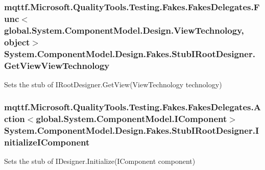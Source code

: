 \hypertarget{class_system_1_1_component_model_1_1_design_1_1_fakes_1_1_stub_i_root_designer_a5acef1b228e6d2b1a75b8c52c7bd778d}{
\subsubsection[{Get\-View\-View\-Technology}]{\setlength{\rightskip}{0pt plus 5cm}mqttf.\-Microsoft.\-Quality\-Tools.\-Testing.\-Fakes.\-Fakes\-Delegates.\-Func$<$global.\-System.\-Component\-Model.\-Design.\-View\-Technology, object$>$ System.\-Component\-Model.\-Design.\-Fakes.\-Stub\-I\-Root\-Designer.\-Get\-View\-View\-Technology}}\label{class_system_1_1_component_model_1_1_design_1_1_fakes_1_1_stub_i_root_designer_a5acef1b228e6d2b1a75b8c52c7bd778d}


Sets the stub of I\-Root\-Designer.\-Get\-View(\-View\-Technology technology)

\hypertarget{class_system_1_1_component_model_1_1_design_1_1_fakes_1_1_stub_i_root_designer_a49ed8935f8f58d52b224edd3f7c7d567}{
\subsubsection[{Initialize\-I\-Component}]{\setlength{\rightskip}{0pt plus 5cm}mqttf.\-Microsoft.\-Quality\-Tools.\-Testing.\-Fakes.\-Fakes\-Delegates.\-Action$<$global.\-System.\-Component\-Model.\-I\-Component$>$ System.\-Component\-Model.\-Design.\-Fakes.\-Stub\-I\-Root\-Designer.\-Initialize\-I\-Component}}\label{class_system_1_1_component_model_1_1_design_1_1_fakes_1_1_stub_i_root_designer_a49ed8935f8f58d52b224edd3f7c7d567}


Sets the stub of I\-Designer.\-Initialize(\-I\-Component component)

